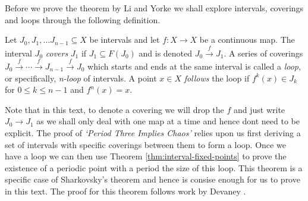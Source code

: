 Before we prove the theorem by Li and Yorke we shall explore intervals, coverings and loops through the following definition.

\begin{defn} \label{defn:covering}
    Let $J_0, J_1, \dots J_{n-1} \subseteq X$ be intervals and let $f: X \to X$ be a continuous map. The interval $J_0$ \emph{covers} $J_1$ if $J_1 \subseteq F(J_0)$ and is denoted $J_0 \xrightarrow{f} J_1$. A series of coverings $J_0 \xrightarrow{f} \cdots \xrightarrow{f} J_{n-1} \xrightarrow{f} J_0$ which starts and ends at the same interval is called a \emph{loop}, or specifically, \emph{n-loop} of intervals. A point $x \in X$ \emph{follows} the loop if $f^k(x) \in J_k$ for $0 \leq k \leq n-1$ and $f^n(x) = x$.
\end{defn}

Note that in this text, to denote a covering we will drop the $f$ and just write $J_0 \to J_1$ as we shall only deal with one map at a time and hence dont need to be explicit. The proof of \emph{`Period Three Implies Chaos'} \cite{li-yorke} relies upon us first deriving a set of intervals with specific coverings between them to form a loop. Once we have a loop we can then use Theorem \ref{thm:interval-fixed-points} to prove the existence of a periodic point with a period the size of this loop. This theorem is a specific case of Sharkovsky's theorem and hence is consise enough for us to prove in this text. The proof for this theorem follows work by Devaney \cite[\S 1.10]{devaney}.

